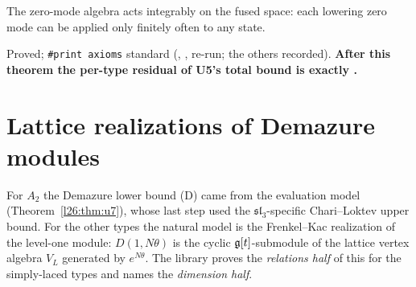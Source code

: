 \begin{physics}
The zero-mode algebra acts integrably on the fused space: each lowering zero mode can be applied only finitely often to any state.
\end{physics}

\begin{status}
Proved; \texttt{\#print axioms} standard (, ,  re-run;
the others recorded). \textbf{After this theorem the per-type residual of U5's total bound is exactly .}
\end{status}

\section{Lattice realizations of Demazure modules}\label{l26:sec:lattice}

For $A_2$ the Demazure lower bound (D) came from the evaluation model (Theorem~\ref{l26:thm:u7}), whose last step used the
$\mathfrak{sl}_3$-specific Chari--Loktev upper bound. For the other types the natural model is the Frenkel--Kac realization of the
level-one module: $D(1,N\theta)$ is the cyclic $\mathfrak g[t]$-submodule of the lattice vertex algebra $V_L$ generated by $e^{N\theta}$.
The library proves the \emph{relations half} of this for the simply-laced types and names the \emph{dimension half}.

